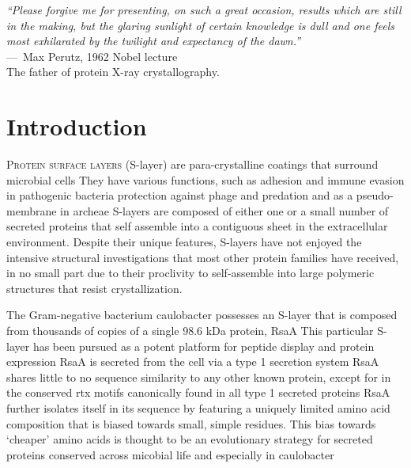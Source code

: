 \acresetall
{}
\begin{epigraph}
  \emph{``Please forgive me for presenting, on such a great occasion, results which are still in the making, but the glaring sunlight of certain knowledge is dull and one feels most exhilarated by the twilight and expectancy of the dawn.''} \\---~Max Perutz, 1962 Nobel lecture\\ The father of protein X-ray crystallography.
\end{epigraph}

\section{Introduction} %
\label{sec:crystal_introduction} 

\lettrine[lines=2]{P}{rotein surface layers} (\acs{S-layer}) are para-crystalline coatings that
surround microbial cells
 They have various functions, such as adhesion
and immune evasion in pathogenic bacteria
 protection against phage and predation
 and as a pseudo-membrane in archeae
 \acp{S-layer} are composed of either one or a small number of secreted proteins that self assemble
into a contiguous sheet in the extracellular environment. Despite their
unique features, \acp{S-layer} have not enjoyed the intensive structural
investigations that most other protein families have received, in no
small part due to their proclivity to self-assemble into large polymeric
structures that resist crystallization.

The Gram-negative bacterium \ac{caulobacter} possesses an
\ac{S-layer} that is composed from thousands of copies of a single 98.6 kDa protein, RsaA
 This particular \ac{S-layer} has been pursued as a potent platform for peptide display and
protein expression
RsaA is secreted from the cell via a type 1
secretion system
 RsaA shares little to no sequence similarity to any
other known protein, except for in the conserved \ac{rtx}
motifs canonically found in all type 1 secreted proteins
 RsaA further isolates itself in its sequence by featuring a uniquely limited amino
acid composition that is biased towards small, simple residues. This bias
towards `cheaper' amino acids is thought to be an evolutionary strategy
for secreted proteins conserved across micobial life and especially in
\ac{caulobacter}

